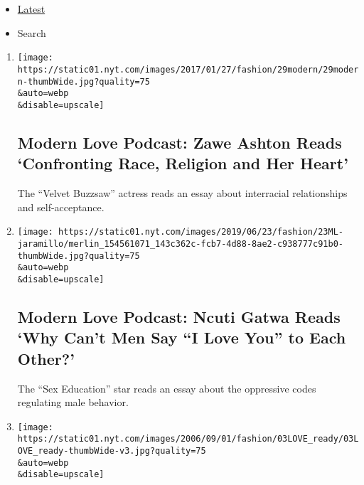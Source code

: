 \begin{itemize}
\tightlist
\item
  \protect\hyperlink{stream-panel}{Latest}
\item
  Search
\end{itemize}

\begin{enumerate}
\def\labelenumi{\arabic{enumi}.}
\item
  \href{/2020/06/24/style/modern-love-podcast-zawe-ashton.html}{}

  \texttt{[image: https://static01.nyt.com/images/2017/01/27/fashion/29modern/29modern-thumbWide.jpg?quality=75\\\&auto=webp\\\&disable=upscale]}

  \hypertarget{modern-love-podcast-zawe-ashton-reads-confronting-race-religion-and-her-heart}{%
  \subsection{Modern Love Podcast: Zawe Ashton Reads `Confronting Race,
  Religion and Her
  Heart'}\label{modern-love-podcast-zawe-ashton-reads-confronting-race-religion-and-her-heart}}

  The ``Velvet Buzzsaw'' actress reads an essay about interracial
  relationships and self-acceptance.
\item
  \href{/2020/06/17/style/modern-love-podcast-ncuti-gatwa.html}{}

  \texttt{[image: https://static01.nyt.com/images/2019/06/23/fashion/23ML-jaramillo/merlin\_154561071\_143c362c-fcb7-4d88-8ae2-c938777c91b0-thumbWide.jpg?quality=75\\\&auto=webp\\\&disable=upscale]}

  \hypertarget{modern-love-podcast-ncuti-gatwa-reads-why-cant-men-say-i-love-you-to-each-other}{%
  \subsection{Modern Love Podcast: Ncuti Gatwa Reads `Why Can't Men Say
  ``I Love You'' to Each
  Other?'}\label{modern-love-podcast-ncuti-gatwa-reads-why-cant-men-say-i-love-you-to-each-other}}

  The ``Sex Education'' star reads an essay about the oppressive codes
  regulating male behavior.
\item
  \href{/2020/06/10/style/modern-love-podcast-lorraine-toussant-updated-poscript.html}{}

  \texttt{[image: https://static01.nyt.com/images/2006/09/01/fashion/03LOVE\_ready/03LOVE\_ready-thumbWide-v3.jpg?quality=75\\\&auto=webp\\\&disable=upscale]}


\end{enumerate}
